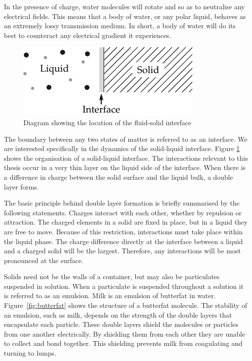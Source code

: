     In the presence of charge, water molecules will rotate and so as to neutralise any electrical fields.
    This means that a body of water, or any polar liquid, behaves as an extremely lossy transmission medium.
    In short, a body of water will do its best to counteract any electrical gradient it experiences.

    \begin{figure}[h]
        \begin{center}
            \includegraphics{content/introduction/graphics/simpleLayerDiagram}
        \end{center}
        \caption{Diagram showing the location of the fluid-solid interface}
        \label{fig:interfaceDiagram}
    \end{figure}

    The boundary between any two states of matter is referred to as an interface.
    We are interested specifically in the dynamics of the solid-liquid interface.
    Figure \ref{fig:interfaceDiagram} shows the organisation of a solid-liquid interface.
    The interactions relevant to this thesis occur in a very thin layer on the liquid side of the interface.
    When there is a difference in charge between the solid surface and the liquid bulk, a double layer forms.

    The basic principle behind double layer formation is briefly summarised by the following statements.
    Charges interact with each other, whether by repulsion or attraction.
    The charged elements in a solid are fixed in place, but in a liquid they are free to move.
    Because of this restriction, interactions must take place within the liquid phase.
    The charge difference directly at the interface between a liquid and a charged solid will be the largest.
    Therefore, any interactions will be most pronounced at the surface.

    Solids need not be the walls of a container, but may also be particulates suspended in solution.
    When a particulate is suspended throughout a solution it is referred to as an emulsion.
    Milk is an emulsion of butterfat in water.
    Figure~\ref{fig:butterfat} shows the structure of a butterfat molecule.
    The stability of an emulsion, such as milk, depends on the strength of the double layers that encapsulate each particle.
    These double layers shield the molecules or particles from one another electrically.
    By shielding them from each other they are unable to collect and bond together.
    This shielding prevents milk from coagulating and turning to lumps.

